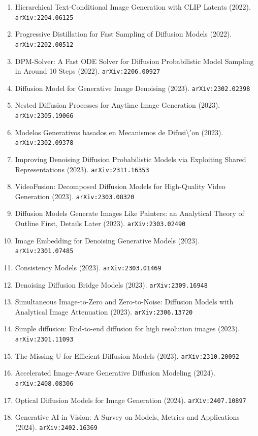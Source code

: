 \documentclass[11pt]{article}
\begin{document}
\begin{enumerate}
  \item Hierarchical Text-Conditional Image Generation with CLIP Latents (2022). \texttt{arXiv:2204.06125}
  \item Progressive Distillation for Fast Sampling of Diffusion Models (2022). \texttt{arXiv:2202.00512}
  \item DPM-Solver: A Fast ODE Solver for Diffusion Probabilistic Model Sampling
  in Around 10 Steps (2022). \texttt{arXiv:2206.00927}
  \item Diffusion Model for Generative Image Denoising (2023). \texttt{arXiv:2302.02398}
  \item Nested Diffusion Processes for Anytime Image Generation (2023). \texttt{arXiv:2305.19066}
  \item Modelos Generativos basados en Mecanismos de Difusi\textbackslash{}'on (2023). \texttt{arXiv:2302.09378}
  \item Improving Denoising Diffusion Probabilistic Models via Exploiting Shared
  Representations (2023). \texttt{arXiv:2311.16353}
  \item VideoFusion: Decomposed Diffusion Models for High-Quality Video
  Generation (2023). \texttt{arXiv:2303.08320}
  \item Diffusion Models Generate Images Like Painters: an Analytical Theory of
  Outline First, Details Later (2023). \texttt{arXiv:2303.02490}
  \item Image Embedding for Denoising Generative Models (2023). \texttt{arXiv:2301.07485}
  \item Consistency Models (2023). \texttt{arXiv:2303.01469}
  \item Denoising Diffusion Bridge Models (2023). \texttt{arXiv:2309.16948}
  \item Simultaneous Image-to-Zero and Zero-to-Noise: Diffusion Models with
  Analytical Image Attenuation (2023). \texttt{arXiv:2306.13720}
  \item Simple diffusion: End-to-end diffusion for high resolution images (2023). \texttt{arXiv:2301.11093}
  \item The Missing U for Efficient Diffusion Models (2023). \texttt{arXiv:2310.20092}
  \item Accelerated Image-Aware Generative Diffusion Modeling (2024). \texttt{arXiv:2408.08306}
  \item Optical Diffusion Models for Image Generation (2024). \texttt{arXiv:2407.10897}
  \item Generative AI in Vision: A Survey on Models, Metrics and Applications (2024). \texttt{arXiv:2402.16369}

\end{enumerate}
\end{document}
